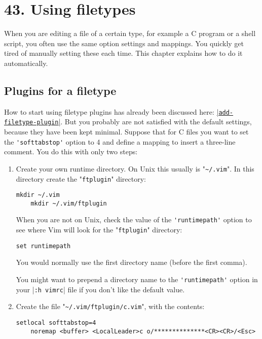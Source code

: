 \section{43. Using filetypes}
When you are editing a file of a certain type, for example a C program or a shell script, you often use the same option settings and mappings.
You quickly get tired of manually setting these each time.
This chapter explains how to do it automatically.
\subsection{Plugins for a filetype}            
\label{filetype-plugin}
How to start using filetype plugins has already been discussed here: \hyperref[add-filetype-plugin]{|\texttt{add-filetype-plugin}|}.
But you probably are not satisfied with the default settings, because they have been kept minimal.
Suppose that for C files you want to set the \verb!'softtabstop'! option to 4 and define a mapping to insert a three-line comment.
You do this with only two steps:

\label{your-runtime-dir}
\begin{enumerate}
				\item Create your own runtime directory.
								On Unix this usually is "\verb!~/.vim!".
								In this directory create the "\verb!ftplugin!" directory:

								\begin{Verbatim}[samepage=true]
	mkdir ~/.vim
	mkdir ~/.vim/ftplugin
								\end{Verbatim}


								When you are not on Unix, check the value of the \verb!'runtimepath'! option to see where Vim will look for the "\verb!ftplugin!" directory:

								\begin{Verbatim}[samepage=true]
 set runtimepath
								\end{Verbatim}

								You would normally use the first directory name (before the first comma).

								You might want to prepend a directory name to the \verb!'runtimepath'! option in your |\verb!:h vimrc!| file if you don't like the default value.

				\item Create the file "\verb!~/.vim/ftplugin/c.vim!", with the contents:
								\begin{Verbatim}[samepage=true]
	setlocal softtabstop=4
	noremap <buffer> <LocalLeader>c o/**************<CR><CR>/<Esc>
								\end{Verbatim}
\end{enumerate}

